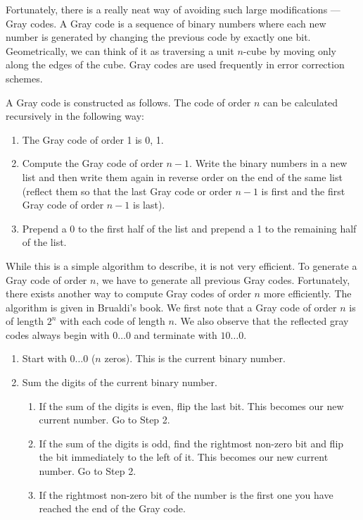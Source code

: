 Fortunately, there is a really neat way of avoiding such large modifications ---  Gray codes. 
A Gray code is a sequence of binary numbers where each new number is generated by
changing the previous code by exactly one bit.  Geometrically, we can think of it as
traversing a unit $n$-cube by moving only along the edges of the cube.
Gray codes are used frequently in error correction schemes.

A Gray code is constructed as follows.\cite{Brualdi2010}
The code of order $n$ can be calculated recursively in the following way:
\begin{enumerate}
\item The Gray code of order 1 is 0, 1.
\item Compute the Gray code of order $n-1$.  Write the binary numbers in a new list and then write them again in reverse order on the end of the same list (reflect them so that the last Gray code or order $n-1$ is first and the first Gray code of order $n-1$ is last).
\item Prepend a 0 to the first half of the list and prepend a 1 to the remaining half of the list.
\end{enumerate}
While this is a simple algorithm to describe, it is not very efficient.  
To generate a Gray code of order $n$, we have to generate all previous Gray codes.
Fortunately, there exists another way to compute Gray codes of order $n$ more efficiently.
The algorithm is given in Brualdi's book.  
We first note that a Gray code of order $n$ is of length $2^n$ with each code of length $n$.
We also observe that the reflected gray codes always begin with $0\dots0$ and terminate with $10\dots0$.
\begin{enumerate}
\item Start with $0\dots0$ ($n$ zeros).  This is the current binary number.
\item Sum the digits of the current binary number.
\begin{enumerate}
\item If the sum of the digits is even, flip the last bit.
This becomes our new current number. Go to Step 2.
\item If the sum of the digits is odd, find the rightmost non-zero bit and flip the bit immediately to the left of it.
This becomes our new current number. Go to Step 2.
\item If the rightmost non-zero bit of the number is the first one you have reached the end of the Gray code.
\end{enumerate}
\end{enumerate}

